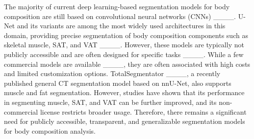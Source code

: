 The majority of current deep learning-based segmentation models for body composition are still based on convolutional neural networks (CNNs) ____. U-Net and its variants are among the most widely used architectures in this domain, providing precise segmentation of body composition components such as skeletal muscle, SAT, and VAT ____. However, these models are typically not publicly accessible and are often designed for specific tasks ____. While a few commercial models are available ____, they are often associated with high costs and limited customization options. TotalSegmentator ____, a recently published general CT segmentation model based on nnU-Net, also supports muscle and fat segmentation. However, studies have shown that its performance in segmenting muscle, SAT, and VAT can be further improved, and its non-commercial license restricts broader usage. Therefore, there remains a significant need for publicly accessible, transparent, and generalizable segmentation models for body composition analysis.
